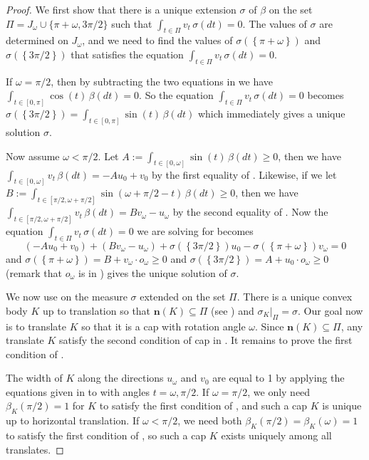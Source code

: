\begin{proof}
We first show that there is a unique extension \(\sigma\) of \(\beta\) on the set \(\Pi = J_\omega \cup \{\pi + \omega, 3\pi/2\}\) such that \(\int_{t \in \Pi} v_t \, \sigma(dt) = 0\). The values of \(\sigma\) are determined on \(J_\omega\), and we need to find the values of \(\sigma(\left\{ \pi + \omega \right\})\) and \(\sigma(\left\{ 3 \pi/2 \right\})\) that satisfies the equation \(\int_{t \in \Pi} v_t \, \sigma(dt) = 0\).

If \(\omega = \pi/2\), then by subtracting the two equations in  we have \(\int_{t \in [0, \pi]} \cos(t)\,\beta(dt) = 0\). So the equation \(\int_{t \in \Pi} v_t \, \sigma(dt) = 0\) becomes \(\sigma(\left\{ 3\pi/2 \right\}) = \int_{t \in [0, \pi]} \sin (t) \,\beta(dt)\) which immediately gives a unique solution \(\sigma\).

Now assume \(\omega < \pi/2\). Let \(A := \int_{t \in [0, \omega]}\sin(t)\,\beta(dt) \geq 0\), then we have \(\int_{t \in [0, \omega]} v_t \,\beta(dt) = - A u_0 + v_0\) by the first equality of . Likewise, if we let \(B := \int_{t \in [\pi/2, \omega + \pi/2]} \sin(\omega + \pi/2 - t)\,\beta(dt) \geq 0\), then we have \(\int_{t \in [\pi/2, \omega + \pi/2]}v_t\,\beta(dt) = B v_\omega - u_\omega\) by the second equality of . Now the equation \(\int_{t \in \Pi} v_t \, \sigma(dt) = 0\) we are solving for becomes
\[
(-Au_0 + v_0) + (Bv_\omega - u_\omega) + \sigma\left( \left\{ 3\pi/2 \right\}  \right)  u_0 - \sigma\left( \left\{ \pi + \omega \right\}  \right)  v_\omega = 0
\]
and \(\sigma(\left\{ \pi + \omega \right\}) = B + v_\omega \cdot o_\omega \geq 0\) and \(\sigma(\left\{ 3 \pi/2 \right\}) = A + u_0 \cdot o_\omega \geq 0\) (remark that \(o_\omega\) is in ) gives the unique solution of \(\sigma\).

We now use  on the measure \(\sigma\) extended on the set \(\Pi\). There is a unique convex body \(K\) up to translation so that \(\mathbf{n}(K) \subseteq \Pi\) (see ) and \(\sigma_K|_{\Pi} = \sigma\). Our goal now is to translate \(K\) so that it is a cap with rotation angle \(\omega\). Since \(\mathbf{n}(K) \subseteq \Pi\), any translate \(K\) satisfy the second condition of cap in . It remains to prove the first condition of .

The width of \(K\) along the directions \(u_\omega\) and \(v_0\) are equal to 1 by applying the equations given in  to  with angles \(t = \omega, \pi/2\). If \(\omega = \pi/2\), we only need \(\beta_K(\pi/2) = 1\) for \(K\) to satisfy the first condition of , and such a cap \(K\) is unique up to horizontal translation. If \(\omega < \pi/2\), we need both \(\beta_K(\pi/2) = \beta_K(\omega) = 1\) to satisfy the first condition of , so such a cap \(K\) exists uniquely among all translates.
\end{proof}